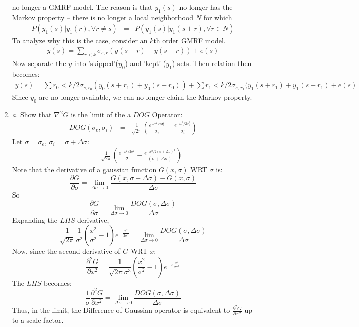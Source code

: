\documentclass{article}
\newcommand{\dsigma}{\Delta\sigma}
\begin{document}
\begin{enumerate}
	no longer a GMRF model.  The reason is that $y_1(s)$ no longer has the 
	Markov property -- there is no longer a local neighborhood $N$ for which
	\begin{eqnarray}
	P\left( y_1(s) | y_1(r),  \forall r \neq s \right) &=& P\left( y_1(s) | y_1(s+r), \forall r \in N \right)
	\end{eqnarray}
	To analyze why this is the case, consider an $k$th order GMRF model.
	\begin{eqnarray}
		y(s) = \sum_{r<k} \sigma_{s,r}(y(s+r)+y(s-r)) + e(s)
	\end{eqnarray}
	Now separate the $y$ into 'skipped'($y_0$) and 'kept' ($y_1$) sets. Then relation then becomes:
	\begin{eqnarray}
		y(s) = \sum{r_0<k/2} \sigma_{s,r_0}(y_0(s+r_1)+y_0(s-r_0)) + \sum{r_1<k/2} \sigma_{s,r_1}(y_1(s+r_1)+y_1(s-r_1) + e(s)
	\end{eqnarray}
	Since $y_0$ are no longer available, we can no longer claim the Markov property.
\item \textit{a.} Show that $\nabla^2 G$ is the limit of the a $DOG$ Operator:
\begin{eqnarray*}
DOG(\sigma_e, \sigma_i) &=& \frac{1}{\sqrt{2\pi}}\left( \frac{e^{-x^2/2\sigma_e^2}}{\sigma_e} - \frac{e^{-x^2/2\sigma_i^2}}{\sigma_i} \right)
\end{eqnarray*}
Let $\sigma = \sigma_e$, $\sigma_i = \sigma + \dsigma$:
\begin{eqnarray*}
&=& \frac{1}{\sqrt{2\pi}}\left( \frac{e^{-x^2/2\sigma^2}}{\sigma} - \frac{e^{-x^2/2(\sigma+\dsigma)^2}}{(\sigma+\dsigma)} \right)
\end{eqnarray*}
Note that the derivative of a gaussian function $G(x,\sigma)$ WRT $\sigma$ is:
$$ \frac{\partial G}{\partial\sigma} = \lim_{\dsigma\to 0} \frac{G(x,\sigma+\dsigma)-G(x,\sigma)}{\dsigma}$$
So
$$ \frac{\partial G}{\partial\sigma} = \lim_{\dsigma\to 0} \frac{DOG(\sigma, \dsigma)}{\dsigma}$$
Expanding the $LHS$ derivative,
$$ \frac{1}{\sqrt{2\pi}} \frac{1}{\sigma^2}\left(\frac{x^2}{\sigma^2}-1\right)e^{-\frac{x^2}{2\sigma^2}} = \lim_{\dsigma\to 0} \frac{DOG(\sigma, \dsigma)}{\dsigma}$$
Now, since the second derivative of $G$ WRT $x$:
$$\frac{\partial^2G}{\partial x^2} = \frac{1}{\sqrt{2\pi}\sigma^3}\left(\frac{x^2}{\sigma^2}-1\right)e^{-x\frac{x^2}{2\sigma^2}}$$ 
The $LHS$ becomes:
$$ \frac{1}{\sigma}\frac{\partial^2G}{\partial x^2} = \lim_{\dsigma\to 0} \frac{DOG(\sigma, \dsigma)}{\dsigma}$$ 
Thus, in the limit, the Difference of Gaussian operator is equivalent to $\frac{\partial^2G}{\partial x^2}$ up to a scale factor.\\

\end{enumerate}
\end{document}
